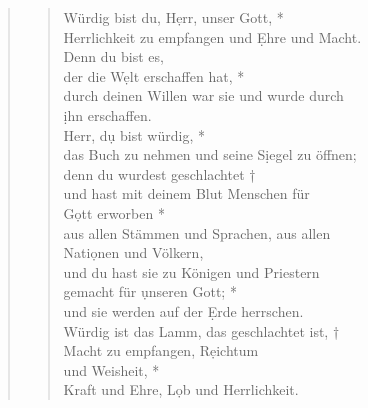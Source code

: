 \def\greinitialformat#1{{\fontsize{40}{40}\selectfont #1}}
\gresetfirstlineaboveinitial{\small \textcolor{red}{Ap 4;5}}{}
\setaboveinitialseparation{0.72mm}



\bf
\newpage 
{}

\begin{quote}
\begin{verse}
Würdig bist du, H\d err, unser Gott, *\\ 
Herrlichkeit zu empfangen und \d Ehre und Macht.\\ 
\vin Denn du bist es,\\ 
\vin der die W\d elt erschaffen hat, *\\ 
\vin durch deinen Willen war sie und wurde durch\\ 
\vin \d ihn erschaffen.\\ 
Herr, d\d u bist würdig, *\\ 
das Buch zu nehmen und seine S\d iegel zu öffnen;\\ 
\vin denn du wurdest geschlachtet †\\ 
\vin und hast mit deinem Blut Menschen für \\ 
\vin G\d ott erworben *\\ 
\vin aus allen Stämmen und Sprachen, aus allen\\ 
\vin Nati\d onen und Völkern, \\
und du hast sie zu Königen und Priestern\\ 
gemacht für \d unseren Gott; *\\  
und sie werden auf der \d Erde herrschen.\\ 
\vin Würdig ist das Lamm, das geschlachtet ist, †\\ 
\vin Macht zu empfangen, R\d eichtum \\ 
\vin und Weisheit, *\\ 
\vin  Kraft und Ehre, L\d ob und Herrlichkeit.\\  

\end{verse}
\end{quote}

\medskip
 
